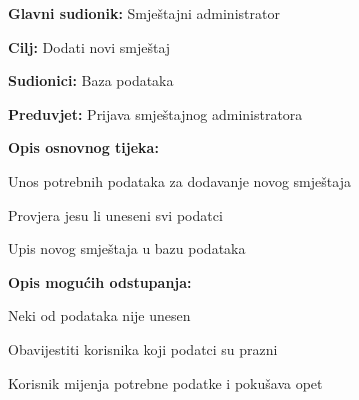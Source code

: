 				\noindent {}
				\begin{packed_item}
					
					\item \textbf{Glavni sudionik: }Smještajni administrator
					\item  \textbf{Cilj:} Dodati novi smještaj
					\item  \textbf{Sudionici:} Baza podataka
					\item  \textbf{Preduvjet:} Prijava smještajnog administratora
					\item  \textbf{Opis osnovnog tijeka:}
					
					\item[] \begin{packed_enum}
						
						\item Unos potrebnih podataka za dodavanje novog smještaja
						\item Provjera jesu li uneseni svi podatci
						\item Upis novog smještaja u bazu podataka
					\end{packed_enum}
					
					\item  \textbf{Opis mogućih odstupanja:}
					
					\item[] \begin{packed_item}
						
						\item[2.a] Neki od podataka nije unesen
						\item[] \begin{packed_enum}
							
							\item Obavijestiti korisnika koji podatci su prazni
							\item Korisnik mijenja potrebne podatke i pokušava opet
							
						\end{packed_enum}
						
					\end{packed_item}
				\end{packed_item}
				
